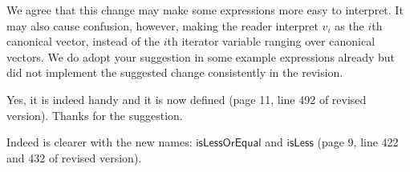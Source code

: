 \answer 
We agree that this change may make some expressions more easy to interpret. It may also cause confusion, however, making the reader interpret $v_i$ as the $i$th canonical vector, instead of the $i$th iterator variable ranging over canonical
vectors. We do adopt your suggestion in some example expressions already but did not implement the suggested change consistently in the revision.


\bigskip

\begin{comment}
	I also suggest to consider introducing some $\texttt{if } e_1 \texttt{ then } e_2 \texttt{ else } e_3$
	construction, where $e_1$ is some expression that evaluates to a scalar $0$ or $1$.
	This is used a lot in the article.
\end{comment}

\answer Yes, it is indeed handy and it is now defined (page 11, line 492 of revised version). Thanks for the suggestion.
\bigskip

\begin{comment}
	You have to rename the $succ$ and $succ+$ expressions, as they in fact do not test
	for successors. What you call successor is the less or equal relation and what
	you call $succ+$ is the less than relation. So $succ$ could be renamed to
	$islessorequal$ and $succ+$ could be named $isless$, which also directly reminds the
	reader that this expression is a Boolean test.
\end{comment}

\answer Indeed is clearer with the new names: $\mathsf{isLessOrEqual}$ and $\mathsf{isLess}$ (page 9, line 422 and 432 of revised version).
\bigskip

\begin{comment}
	You seem to mix $\to$ and $\mapsto$ in function specifications in a random way.
	Function signatures use $\to$ ($f \colon A \to B$, where $A$ and $B$ are domain and
	image of $f$), while $\mapsto$ is used for concrete mappings (e.g., $f \colon n
	\mapsto n^2$).
\end{comment}

